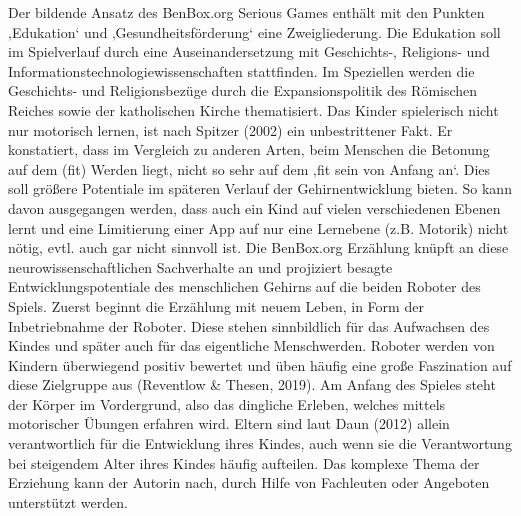\documentclass[
  a4paper,
  DIV=11,
  numbers=noendperiod,
  onecolumn,
  oneside,
  a4paper]{scrartcl}
\begin{document}
Der bildende Ansatz des BenBox.org Serious Games enthält mit den Punkten
‚Edukation` und ‚Gesundheitsförderung` eine Zweigliederung. Die
Edukation soll im Spielverlauf durch eine Auseinandersetzung mit
Geschichts-, Religions- und Informationstechnologiewissenschaften
stattfinden. Im Speziellen werden die Geschichts- und Religionsbezüge
durch die Expansionspolitik des Römischen Reiches sowie der katholischen
Kirche thematisiert. Das Kinder spielerisch nicht nur motorisch lernen,
ist nach Spitzer (2002) ein unbestrittener Fakt. Er konstatiert, dass im
Vergleich zu anderen Arten, beim Menschen die Betonung auf dem (fit)
Werden liegt, nicht so sehr auf dem ‚fit sein von Anfang an`. Dies soll
größere Potentiale im späteren Verlauf der Gehirnentwicklung bieten. So
kann davon ausgegangen werden, dass auch ein Kind auf vielen
verschiedenen Ebenen lernt und eine Limitierung einer App auf nur eine
Lernebene (z.B. Motorik) nicht nötig, evtl. auch gar nicht sinnvoll ist.
Die BenBox.org Erzählung knüpft an diese neurowissenschaftlichen
Sachverhalte an und projiziert besagte Entwicklungspotentiale des
menschlichen Gehirns auf die beiden Roboter des Spiels. Zuerst beginnt
die Erzählung mit neuem Leben, in Form der Inbetriebnahme der Roboter.
Diese stehen sinnbildlich für das Aufwachsen des Kindes und später auch
für das eigentliche Menschwerden. Roboter werden von Kindern überwiegend
positiv bewertet und üben häufig eine große Faszination auf diese
Zielgruppe aus (Reventlow \& Thesen, 2019). Am Anfang des Spieles steht
der Körper im Vordergrund, also das dingliche Erleben, welches mittels
motorischer Übungen erfahren wird. Eltern sind laut Daun (2012) allein
verantwortlich für die Entwicklung ihres Kindes, auch wenn sie die
Verantwortung bei steigendem Alter ihres Kindes häufig aufteilen. Das
komplexe Thema der Erziehung kann der Autorin nach, durch Hilfe von
Fachleuten oder Angeboten unterstützt werden.
\end{document}
